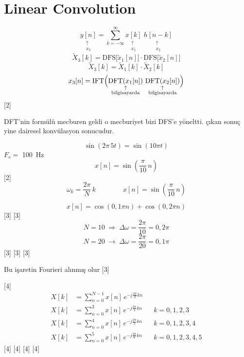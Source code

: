 \documentclass[11pt,a4paper]{article}
\begin{document}
\section{Linear Convolution}
\[ \underset{\substack{\uparrow\\ x_3}}{y[n]} = \sum_{k=-\infty}^{\infty} \underset{\substack{\uparrow\\ x_1}}{x[k]}\; \underset{\substack{\uparrow\\ x_2}}{h[n-k]} \]
\[ \tilde{X}_3[k] = \mathrm{DFS}\bigl[\tilde{x}_1[n]\bigr] \cdot \mathrm{DFS}\bigl[\tilde{x}_2[n]\bigr] \]
\[ \tilde{X}_3[k] = \tilde{X}_1[k] \cdot \tilde{X}_2[k] \]
\[ x_3[n] = \mathrm{IFT}\Bigl(\underset{\substack{\uparrow\\ \text{bilgisayarda}}}{\mathrm{DFT}(x_1[n])}\ \underset{\substack{\uparrow\\ \text{bilgisayarda}}}{\mathrm{DFT}(x_2[n])}\Bigr) \]
[2]

DFT'nin formülü mecburen geldi o mecburiyet bizi DFS'e yöneltti. çıkan sonuç yine dairesel konvülasyon sonucudur.

\[ \sin(2\pi\, 5t) = \sin(10\pi t) \]
$F_s =$ \qty{100}{\hertz}
\[ x[n] = \sin\!\left(\frac{\pi}{10}\,n\right) \]
[2]
\[ \omega_k = \frac{2\pi}{N}\,k \qquad\qquad x[n] = \sin\!\left(\frac{\pi}{10}\,n\right) \]

\[ x[n] = \cos(0{,}1\pi n) + \cos(0{,}2\pi n) \]
[3]
[3]
\[ N=10 \;\Rightarrow\; \Delta\omega = \frac{2\pi}{10} = 0{,}2\pi \]
\[ N=20 \;\longrightarrow\; \Delta\omega = \frac{2\pi}{20} = 0{,}1\pi \]
[3]
[3]
[3]

Bu işaretin Fourieri alınmış olur
[3]

[4]
\begin{align*}
X[k] &= \sum_{n=0}^{N-1} x[n]\, e^{-j\frac{2\pi}{N}kn} \\
X[k] &= \sum_{n=0}^{3} x[n]\, e^{-j\frac{2\pi}{4}kn} && k=0,1,2,3 \\
X[k] &= \sum_{n=0}^{4} x[n]\, e^{-j\frac{2\pi}{5}kn} && k=0,1,2,3,4 \\
X[k] &= \sum_{n=0}^{5} x[n]\, e^{-j\frac{2\pi}{6}kn} && k=0,1,2,3,4,5
\end{align*}
[4]
[4]
[4]
[4]
\end{document}
